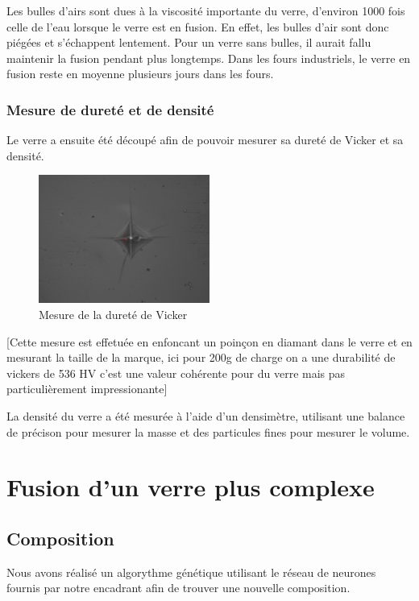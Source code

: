 \documentclass{article}
\begin{document}
Les bulles d'airs sont dues à la viscosité importante du verre, d'environ 1000 fois celle de l'eau lorsque le verre est en fusion. En effet, les bulles d'air sont donc piégées et s'échappent lentement. Pour un verre sans bulles, il aurait fallu maintenir la fusion pendant plus longtemps. Dans les fours industriels, le verre en fusion reste en moyenne plusieurs jours dans les fours.

\subsubsection{Mesure de dureté et de densité}

Le verre a ensuite été découpé afin de pouvoir mesurer sa dureté de Vicker et sa densité. 


\begin{figure}[h]
    \centering
    \includegraphics[width=0.5\textwidth]{photos/dureté.jpg}
    \caption{Mesure de la dureté de Vicker}
\end{figure}

[Cette mesure est effetuée en enfoncant un poinçon en diamant dans le verre et en mesurant la taille de la marque, ici pour 200g de charge on a une durabilité de vickers de 536 HV c'est une valeur cohérente pour du verre mais pas particulièrement impressionante]


La densité du verre a été mesurée à l'aide d'un densimètre, utilisant une balance de précison pour mesurer la masse et des particules fines pour mesurer le volume. 

\section{Fusion d'un verre plus complexe}

\subsection{Composition}

Nous avons réalisé un algorythme génétique utilisant le réseau de neurones fournis par notre encadrant afin de trouver une nouvelle composition. 
\end{document}
